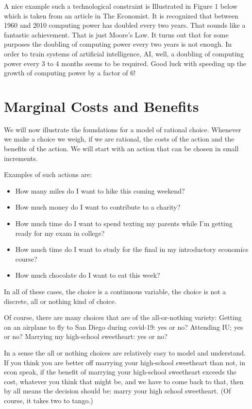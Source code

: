 \documentclass[
]{book}
\providecommand{\tightlist}{%
  \setlength{\itemsep}{0pt}\setlength{\parskip}{0pt}}
\begin{document}
A nice example such a technological constraint is Illustrated in Figure 1 below which is taken from an article in The Economist. It is recognized that between 1960 and 2010 computing power has doubled every two years. That sounds like a fantastic achievement. That is just Moore's Law. It turns out that for some purposes the doubling of computing power every two years is not enough. In order to train systems of artificial intelligence, AI, well, a doubling of computing power every 3 to 4 months seems to be required. Good luck with speeding up the growth of computing power by a factor of 6!

\hypertarget{marginal-costs-and-benefits}{%
\section{Marginal Costs and Benefits}\label{marginal-costs-and-benefits}}

We will now illustrate the foundations for a model of rational choice. Whenever we make a choice we weigh, if we are rational, the costs of the action and the benefits of the action. We will start with an action that can be chosen in small increments.

Examples of such actions are:

\begin{itemize}
\tightlist
\item
  How many miles do I want to hike this coming weekend?
\item
  How much money do I want to contribute to a charity?
\item
  How much time do I want to spend texting my parents while I'm getting ready for my exam in college?
\item
  How much time do I want to study for the final in my introductory economics course?
\item
  How much chocolate do I want to eat this week?
\end{itemize}

In all of these cases, the choice is a continuous variable, the choice is not a discrete, all or nothing kind of choice.

Of course, there are many choices that are of the all-or-nothing variety:
Getting on an airplane to fly to San Diego during covid-19: yes or no?
Attending IU; yes or no?
Marrying my high-school sweetheart: yes or no?

In a sense the all or nothing choices are relatively easy to model and understand. If you think you are better off marrying your high-school sweetheart than not, in econ speak, if the benefit of marrying your high-school sweetheart exceeds the cost, whatever you think that might be, and we have to come back to that, then by all means the decision should be: marry your high school sweetheart. (Of course, it takes two to tango.)
\end{document}
